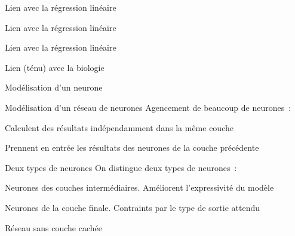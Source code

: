 \begin{frame}{Lien avec la régression linéaire}
\end{frame}

\begin{frame}{Lien avec la régression linéaire}
\end{frame}

\begin{frame}{Lien avec la régression linéaire}
\end{frame}

\begin{frame}{Lien (ténu) avec la biologie}
\end{frame}

\begin{frame}{Modélisation d'un neurone}
\end{frame}

\begin{frame}{Modélisation d'un réseau de neurones}
  Agencement de beaucoup de neurones~:
  \begin{description}[<+->]
    \item[En parallèle] Calculent des résultats indépendamment dans la même couche
    \item[En série] Prennent en entrée les résultats des neurones de la couche précédente
  \end{description}
\end{frame}

\begin{frame}{Deux types de neurones}
  On distingue deux types de neurones~:
  \begin{description}[<+->]
    \item[Neurones cachés] Neurones des couches intermédiaires. Améliorent l'expressivité du modèle
    \item[Neurones de sortie] Neurones de la couche finale. Contraints par le type de sortie attendu
  \end{description}
\end{frame}

\begin{frame}{Réseau sans couche cachée}
  \centering
\end{frame}

